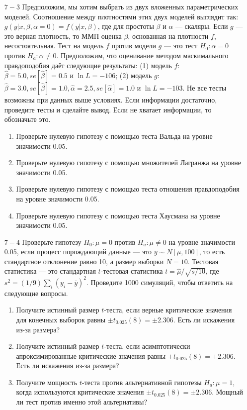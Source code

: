 \begin{enumerate}
\item [$7-3$] Предположим, мы хотим выбрать из двух вложенных параметрических моделей. Соотношение между плотностями этих двух моделей выглядит так: $g(y|x, \beta, \alpha = 0) = f(y|x, \beta)$, где для простоты $\beta$ и $\alpha$ --- скаляры. Если $g$ --- это верная плотность, то ММП оценка $\beta$, основанная на плотности $f$, несостоятельная. Тест на модель $f$ против модели $g$ --- это тест $H_0: \alpha = 0$ против $H_a: \alpha \not= 0$. Предположим, что оценивание методом маскимального правдоподобия даёт следующие результаты: (1) модель $f$: $\hat{\beta} = 5.0, se[\hat{\beta}] = 0.5$ и $\ln L = - 106$; (2) модель $g$: $\hat{\beta} = 3.0, se[\hat{\beta}] = 1.0, \hat{\alpha} = 2.5, se[\hat{\alpha}] = 1.0$ и $\ln L = - 103$. Не все тесты возможны при данных выше условиях. Если информации достаточно, проведите тесты и сделайте вывод. Если не хватает информации, то обозначьте это.
\begin{enumerate}
\item Проверьте нулевую гипотезу с помощью теста Вальда на уровне значимости 0.05. 
\item Проверьте нулевую гипотезу с помощью множителей Лагранжа на уровне значимости 0.05. 
\item Проверьте нулевую гипотезу с помощью теста отношения правдоподобия на уровне значимости 0.05. 
\item Проверьте нулевую гипотезу с помощью теста Хаусмана на уровне значимости 0.05. 
\end{enumerate}
\item [$7-4$] Проверьте гипотезу $H_0: \mu = 0$ против $H_a: \mu \not= 0$ на уровне значимости 0.05, если процесс порождающий данные --- это $y \sim N[\mu, 100]$, то есть стандартное отклонение равно 10, а размер выборки $N = 10$. Тестовая статистика --- это стандартная $t$-тестовая статистика $t = \hat{\mu}/\sqrt{s/10}$, где $s^2 = (1/9) \sum_i (y_i - \bar{y})^2$. Проведите 1000 симуляций, чтобы ответить на следующие вопросы.
\begin{enumerate}
\item Получите истинный размер $t$-теста, если верные критические значения для конечных выборок равны $\pm t_{0.025}(8) = \pm 2.306$. Есть ли искажения из-за размера?
\item Получите истинный размер $t$-теста, если асимптотически апроксимированные критические значения равны $\pm t_{0.025}(8) = \pm 2.306$. Есть ли искажения из-за размера?
\item Получите мощность $t$-теста против альтернативной гипотезы $H_a: \mu = 1$, когда используются критические значения $\pm t_{0.025}(8) = \pm 2.306$. Мощный ли тест против именно этой альтернативы?

\end{enumerate}
\end{enumerate}
